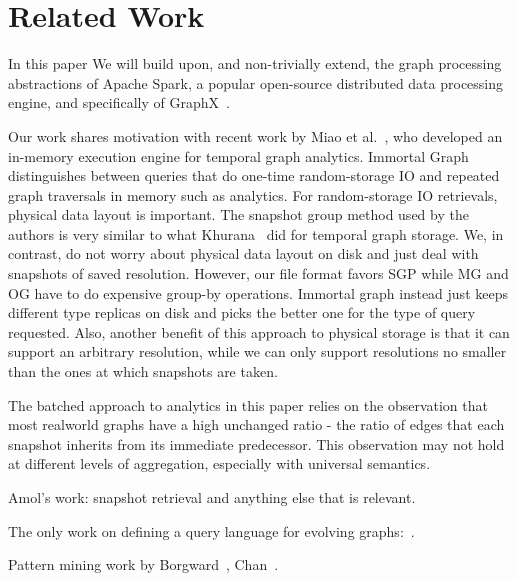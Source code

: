 \section{Related Work}
\label{sec:related}

In this paper We will build upon, and non-trivially extend, the graph
processing abstractions of Apache Spark, a popular open-source
distributed data processing engine, and specifically of
GraphX~\cite{DBLP:conf/osdi/GonzalezXDCFS14}.  

Our work shares motivation with recent work by Miao et
al.~\cite{DBLP:journals/tos/MiaoHLWYZPCC15}, who developed an
in-memory execution engine for temporal graph analytics.  Immortal
Graph distinguishes between queries that do one-time random-storage IO
and repeated graph traversals in memory such as analytics.  For
random-storage IO retrievals, physical data layout is important.  The
snapshot group method used by the authors is very similar to what
Khurana~\cite{} did for temporal graph storage.  We, in contrast, do
not worry about physical data layout on disk and just deal with
snapshots of saved resolution.  However, our file format favors SGP
while MG and OG have to do expensive group-by operations.  Immortal
graph instead just keeps different type replicas on disk and picks the
better one for the type of query requested.  Also, another benefit of
this approach to physical storage is that it can support an arbitrary
resolution, while we can only support resolutions no smaller than the
ones at which snapshots are taken.

The batched approach to analytics in this paper relies on the
observation that most realworld graphs have a high unchanged ratio -
the ratio of edges that each snapshot inherits from its immediate
predecessor.  This observation may not hold at different levels of
aggregation, especially with universal semantics.

Amol's work: snapshot retrieval and anything else that is relevant.

The only work on defining a query language for evolving graphs:~\cite{Kan2009}.

Pattern mining work by Borgward~\cite{Borgwardt2006}, Chan~\cite{Chan2008}.
